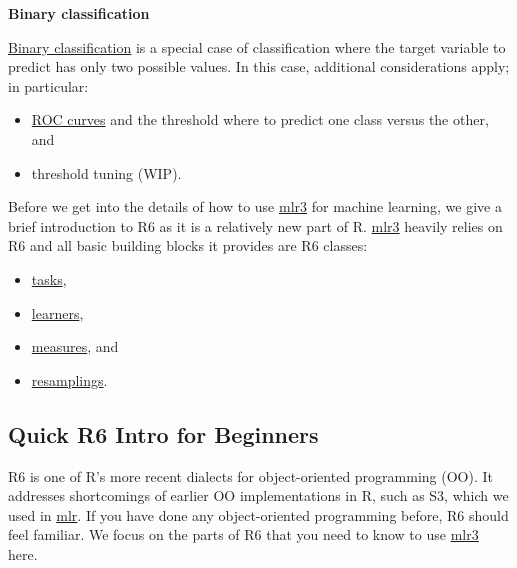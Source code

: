 \documentclass[]{article}
\providecommand{\tightlist}{%
  \setlength{\itemsep}{0pt}\setlength{\parskip}{0pt}}
\begin{document}
\textbf{Binary classification}

\protect\hyperlink{binary}{Binary classification} is a special case of classification where the target variable to predict has only two possible values.
In this case, additional considerations apply; in particular:

\begin{itemize}
\tightlist
\item
  \protect\hyperlink{binary-roc}{ROC curves} and the threshold where to predict one class versus the other, and
\item
  threshold tuning (WIP).
\end{itemize}

Before we get into the details of how to use \href{https://mlr3.mlr-org.com}{mlr3} for machine learning, we give a brief introduction to R6 as it is a relatively new part of R.
\href{https://mlr3.mlr-org.com}{mlr3} heavily relies on R6 and all basic building blocks it provides are R6 classes:

\begin{itemize}
\tightlist
\item
  \protect\hyperlink{tasks}{tasks},
\item
  \protect\hyperlink{learners}{learners},
\item
  \protect\hyperlink{measures}{measures}, and
\item
  \protect\hyperlink{resampling}{resamplings}.
\end{itemize}

\hypertarget{r6}{%
\subsection{Quick R6 Intro for Beginners}\label{r6}}

R6 is one of R's more recent dialects for object-oriented programming (OO).
It addresses shortcomings of earlier OO implementations in R, such as S3, which we used in \href{https://mlr.mlr-org.com}{mlr}.
If you have done any object-oriented programming before, R6 should feel familiar.
We focus on the parts of R6 that you need to know to use \href{https://mlr3.mlr-org.com}{mlr3} here.
\end{document}
